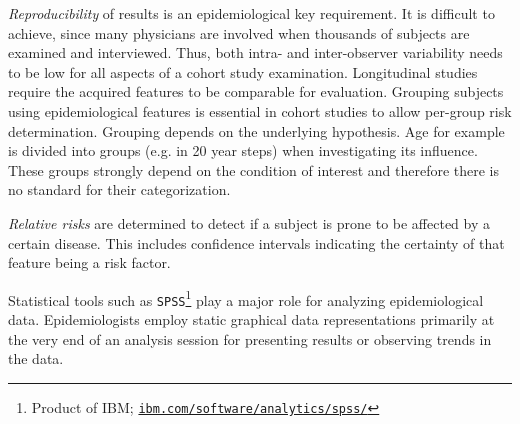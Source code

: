 \documentclass[journal]{style/vgtc} 			          %
\newcommand{\add}[1]{\textcolor{blue}{\uline{#1}}}
\begin{document}
\emph{Reproducibility} of results is an epidemiological key requirement.
%
It is difficult to achieve, since many physicians are involved when thousands of subjects are examined and interviewed.
%
Thus, both intra- and inter-observer variability needs to be low for all aspects of a cohort study examination.
%
Longitudinal studies require the acquired features to be comparable for evaluation.
%
%
%
Grouping subjects using epidemiological features is essential in cohort studies to allow per-group risk determination.
%
Grouping depends on the underlying hypothesis.
%
Age for example is divided into groups (e.g. in 20 year steps) when investigating its influence.
%
These groups strongly depend on the condition of interest and therefore there is no standard for their categorization.

%
\emph{Relative risks} are determined to detect if a subject is prone to be affected by a certain disease.
%
This includes confidence intervals indicating the certainty of that feature being a risk factor.
%
%
%
%
%
%

Statistical tools such as \texttt{SPSS}\footnote{Product of IBM; \href{http://ibm.com/software/analytics/spss/}{\texttt{ibm.com/software/analytics/spss/}}} play a major role for analyzing epidemiological data.
%
Epidemiologists employ static graphical data representations primarily at the very end of an analysis session for presenting results or observing trends in the data.
	
\end{document}
